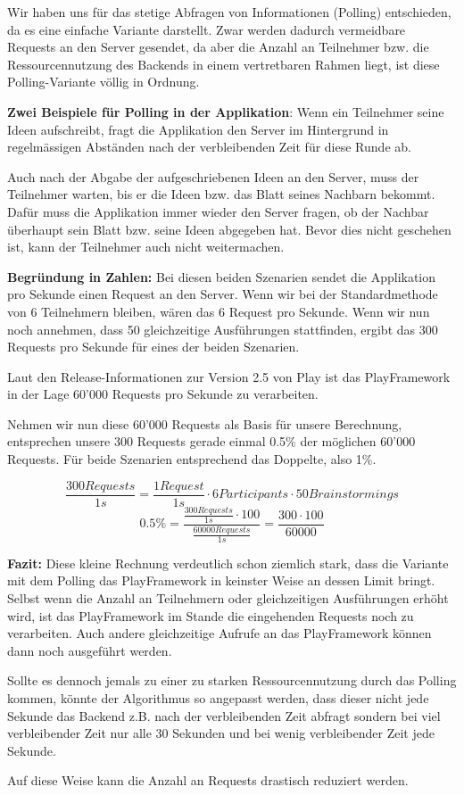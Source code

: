 Wir haben uns für das stetige Abfragen von Informationen (Polling) entschieden, da es eine einfache Variante darstellt. Zwar werden dadurch vermeidbare Requests an den Server gesendet, da aber die Anzahl an Teilnehmer bzw. die Ressourcennutzung des Backends in einem vertretbaren Rahmen liegt, ist diese Polling-Variante völlig in Ordnung.  

\textbf{Zwei Beispiele für Polling in der Applikation}: Wenn ein Teilnehmer seine Ideen aufschreibt, fragt die Applikation den Server im Hintergrund in regelmässigen Abständen nach der verbleibenden Zeit für diese Runde ab.


Auch nach der Abgabe der aufgeschriebenen Ideen an den Server, muss der Teilnehmer warten, bis er die Ideen bzw. das Blatt seines Nachbarn bekommt. Dafür muss die Applikation immer wieder den Server fragen, ob der Nachbar überhaupt sein Blatt bzw. seine Ideen abgegeben hat. Bevor dies nicht geschehen ist, kann der Teilnehmer auch nicht weitermachen.


\textbf{Begründung in Zahlen:}
Bei diesen beiden Szenarien sendet die Applikation pro Sekunde einen Request an den Server. Wenn wir bei der Standardmethode von 6 Teilnehmern bleiben, wären das 6 Request pro Sekunde. Wenn wir nun noch annehmen, dass 50 gleichzeitige Ausführungen stattfinden, ergibt das 300 Requests pro Sekunde für eines der beiden Szenarien.


Laut den Release-Informationen zur Version 2.5 von Play \cite{Play25} ist das PlayFramework in der Lage 60'000 Requests pro Sekunde zu verarbeiten.


Nehmen wir nun diese 60'000 Requests als Basis für unsere Berechnung, entsprechen unsere 300 Requests gerade einmal 0.5\% der möglichen 60'000 Requests. Für beide Szenarien entsprechend das Doppelte, also 1\%.

\[\frac{300Requests}{1s}=\frac{1Request}{1s}\cdot6Participants \cdot50Brainstormings\]
\[0.5\%= \frac{\frac{300Requests}{1s} \cdot 100}{\frac{60000Requests}{1s}} = \frac{300 \cdot 100}{60000}\]

\textbf{Fazit:} Diese kleine Rechnung verdeutlich schon ziemlich stark, dass die Variante mit dem Polling das PlayFramework in keinster Weise an dessen Limit bringt. Selbst wenn die Anzahl an Teilnehmern oder gleichzeitigen Ausführungen erhöht wird, ist das PlayFramework im Stande die eingehenden Requests noch zu verarbeiten. Auch andere gleichzeitige Aufrufe an das PlayFramework können dann noch ausgeführt werden.

Sollte es dennoch jemals zu einer zu starken Ressourcennutzung durch das Polling kommen, könnte der Algorithmus so angepasst werden, dass dieser nicht jede Sekunde das Backend z.B. nach der verbleibenden Zeit abfragt sondern bei viel verbleibender Zeit nur alle 30 Sekunden und bei wenig verbleibender Zeit jede Sekunde.

Auf diese Weise kann die Anzahl an Requests drastisch reduziert werden.
